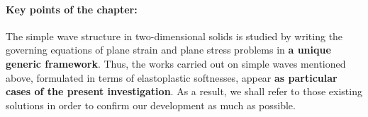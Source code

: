 \paragraph*{Key points of the chapter:} The simple wave structure in two-dimensional solids is studied by writing the governing equations of plane strain and plane stress problems in \textbf{a unique generic framework}.
Thus, the works carried out on simple waves mentioned above, formulated in terms of elastoplastic softnesses, appear \textbf{as particular cases of the present investigation}.
As a result, we shall refer to those existing solutions in order to confirm our development as much as possible.

